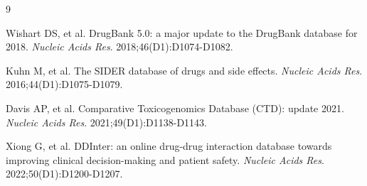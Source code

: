 \documentclass[11pt]{article}
\begin{document}

\begin{thebibliography}{9}

Wishart DS, et al.
DrugBank 5.0: a major update to the DrugBank database for 2018.
\textit{Nucleic Acids Res}. 2018;46(D1):D1074-D1082.

Kuhn M, et al.
The SIDER database of drugs and side effects.
\textit{Nucleic Acids Res}. 2016;44(D1):D1075-D1079.

Davis AP, et al.
Comparative Toxicogenomics Database (CTD): update 2021.
\textit{Nucleic Acids Res}. 2021;49(D1):D1138-D1143.

Xiong G, et al.
DDInter: an online drug-drug interaction database towards improving clinical decision-making and patient safety.
\textit{Nucleic Acids Res}. 2022;50(D1):D1200-D1207.

\end{thebibliography}
\end{document}
